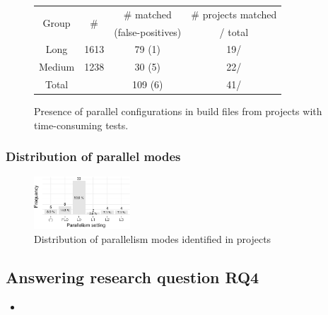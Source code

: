 \begin{figure}[ht!]
    \centering
    \begin{tabular*}{0.48\textwidth}{@{\extracolsep{\fill}}cccc}
        \toprule
        \multirow{2}{*}{Group} & \multirow{2}{*}{\# \pomf{}} & \# \pomf{} matched & \# projects matched\\%
                               &                             &  (false-positives) &       / total\\%
        \midrule%
        Long   & 1613 & 79 (1) & 19/\numLong{}\\%
        Medium & 1238 & 30 (5) & 22/\numMed{}\\%
        \midrule%
        Total  & \pomMedLong{} & 109 (6) & 41/\numMedLong{}\\%
        \bottomrule%
    \end{tabular*}
    \caption{Presence of parallel configurations in build files from
    projects with time-consuming tests. }
    \label{tab:inspection-table} 
\end{figure}

\subsubsection{Distribution of parallel modes}


\begin{figure}[h!]
    \centering
    \includegraphics[width=0.32\textwidth]{plots/barplot-modes.pdf}
    \caption{\label{fig:freqmodes}Distribution of parallelism modes
    identified in  projects}
\end{figure}



\subsection{Answering research question RQ4}
\label{sec:rqD}

\begin{itemize}
    \item \emph{\RQD}
\end{itemize}

